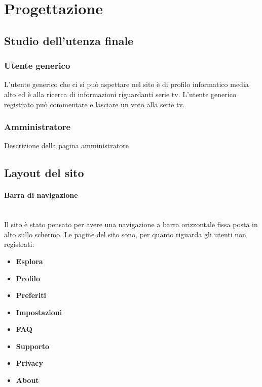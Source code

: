 \newpage
\section{Progettazione}
\subsection{Studio dell'utenza finale}
\subsubsection{Utente generico}
L'utente generico che ci si può aspettare nel sito è di profilo informatico media alto ed è alla ricerca di informazioni riguardanti serie tv. L'utente generico registrato può commentare e lasciare un voto alla serie tv.


\subsubsection{Amministratore}
Descrizione della pagina amministratore 

\subsection{Layout del sito}


\paragraph{Barra di navigazione}
~\\Il sito è stato pensato per avere una navigazione a barra orizzontale fissa posta in alto sullo schermo. Le pagine del sito sono, per quanto riguarda gli utenti non registrati:
\begin{itemize}
	\item \textbf{\normalsize{Esplora}}
	\item \textbf{\normalsize{Profilo}}
	\item \textbf{\normalsize{Preferiti}}
	\item \textbf{\normalsize{Impostazioni}}
	\item \textbf{\normalsize{FAQ}}
	\item \textbf{\normalsize{Supporto}}	
	\item \textbf{\normalsize{Privacy}}
	\item \textbf{\normalsize{About}}
\end{itemize}

